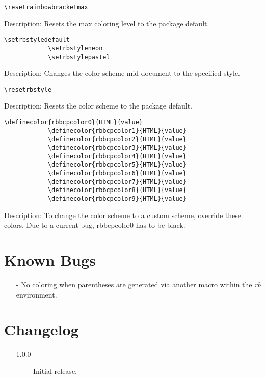 \documentclass[10pt, a4paper]{article}
\newenvironment{itemizeexamplecommand}{
	\begin{itemize}
		\setlength\itemsep{-0.2em}
	}
	{
	\end{itemize}
}
\begin{document}
	\xe
	\pex\begin{itemizeexamplecommand}
		\item[] \begin{lstlisting}[style=B]
			\resetrainbowbracketmax
		\end{lstlisting}
		{\scriptsize
			\item[] Description: Resets the max coloring level to the package default.}
	\end{itemizeexamplecommand}
	\xe
	\pex\begin{itemizeexamplecommand}
		\item[] \begin{lstlisting}[style=B]
			\setrbstyledefault
			\setrbstyleneon
			\setrbstylepastel
		\end{lstlisting}
		{\scriptsize
			\item[] Description: Changes the color scheme mid document to the specified style.}
	\end{itemizeexamplecommand}
	\xe
	\pex\begin{itemizeexamplecommand}
		\item[] \begin{lstlisting}[style=B]
			\resetrbstyle
		\end{lstlisting}
		{\scriptsize
			\item[] Description: Resets the color scheme to the package default.}
	\end{itemizeexamplecommand}
	\xe
	\pex\begin{itemizeexamplecommand}
		\item[] \begin{lstlisting}[style=B]
			\definecolor{rbbcpcolor0}{HTML}{value}
			\definecolor{rbbcpcolor1}{HTML}{value}
			\definecolor{rbbcpcolor2}{HTML}{value}
			\definecolor{rbbcpcolor3}{HTML}{value}
			\definecolor{rbbcpcolor4}{HTML}{value}
			\definecolor{rbbcpcolor5}{HTML}{value}
			\definecolor{rbbcpcolor6}{HTML}{value}
			\definecolor{rbbcpcolor7}{HTML}{value}
			\definecolor{rbbcpcolor8}{HTML}{value}
			\definecolor{rbbcpcolor9}{HTML}{value}
		\end{lstlisting}
		{\scriptsize
			\item[] Description: To change the color scheme to a custom scheme, override these colors. Due to a current bug, rbbcpcolor0 has to be black.}
	\end{itemizeexamplecommand}
	\xe
	\section{Known Bugs}
	\begin{enumerate}
		\item[-] No coloring when parentheses are generated via another macro within the \textit{rb} environment.
	\end{enumerate}
	\section{Changelog}
	\begin{itemize}
		\item[1.0.0] 
		\begin{enumerate}
			\item[-] Initial release.
		\end{enumerate}
	\end{itemize}
\end{document}
